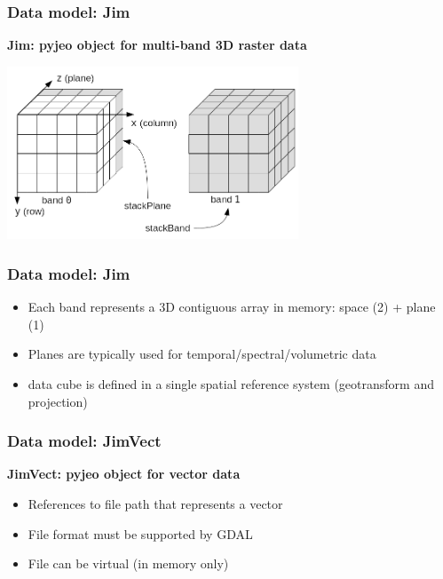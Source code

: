 \documentclass[11pt, handout, aspectratio=169]{beamer}
\begin{document}

\begin{frame}[fragile]
  \frametitle{Data model: Jim}

  \vspace{7mm}
  \textbf{Jim: pyjeo object for multi-band 3D raster data}

	\begin{center}
		\includegraphics[width=0.65\textwidth]{figures/cube}
	\end{center}
\end{frame}

\begin{frame}[fragile]
  \frametitle{Data model: Jim}
  \begin{itemize}
  \item Each band represents a 3D contiguous array in memory: space (2) + plane (1)
  \item Planes are typically used for temporal/spectral/volumetric data
  \item data cube is defined in a single spatial reference system (geotransform and projection)
  \end{itemize}
\end{frame}

\begin{frame}[fragile]
  \frametitle{Data model: JimVect}
  \vspace{7mm}
  \textbf{JimVect: pyjeo object for vector data}
  \vspace{7mm}
  \begin{itemize}
  \item References to file path that represents a vector
  \item File format must be supported by GDAL
  \item File can be virtual (in memory only)
  \end{itemize}
\end{frame}
\end{document}
